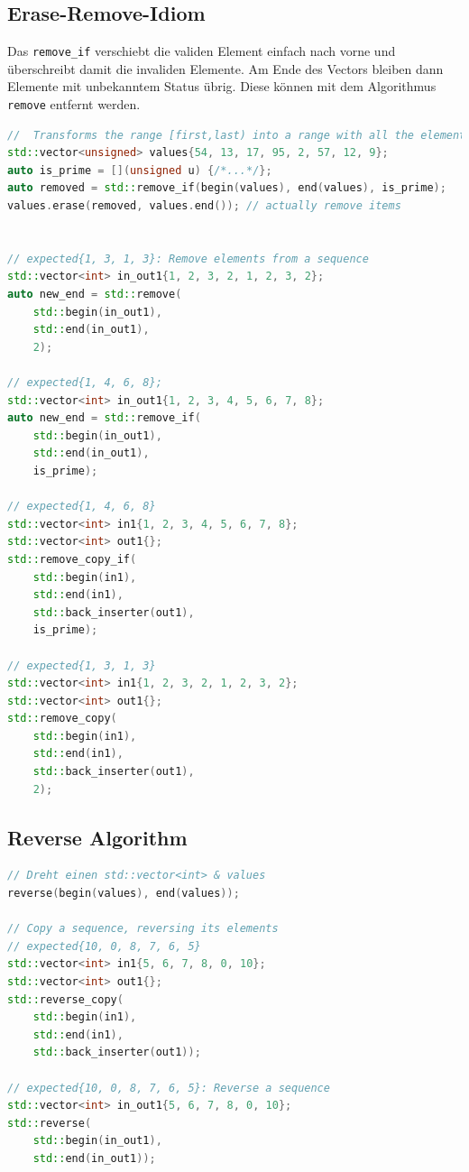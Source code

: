\subsection{Erase-Remove-Idiom}
Das \lstinline|remove_if| verschiebt die validen Element einfach nach vorne und überschreibt damit die invaliden Elemente. Am Ende des Vectors bleiben dann Elemente mit unbekanntem Status übrig. Diese können mit dem Algorithmus \lstinline|remove| entfernt werden.
\begin{lstlisting}[language=C++, caption=Erase-Remove-Idiom]
//  Transforms the range [first,last) into a range with all the elements for which pred returns true removed, and returns an iterator to the new end of that range.
std::vector<unsigned> values{54, 13, 17, 95, 2, 57, 12, 9};
auto is_prime = [](unsigned u) {/*...*/};
auto removed = std::remove_if(begin(values), end(values), is_prime);
values.erase(removed, values.end()); // actually remove items


// expected{1, 3, 1, 3}: Remove elements from a sequence
std::vector<int> in_out1{1, 2, 3, 2, 1, 2, 3, 2};
auto new_end = std::remove(
	std::begin(in_out1),
	std::end(in_out1),
	2);
	
// expected{1, 4, 6, 8};
std::vector<int> in_out1{1, 2, 3, 4, 5, 6, 7, 8};
auto new_end = std::remove_if(
	std::begin(in_out1),
	std::end(in_out1),
	is_prime);
	
// expected{1, 4, 6, 8}
std::vector<int> in1{1, 2, 3, 4, 5, 6, 7, 8};
std::vector<int> out1{};
std::remove_copy_if(
	std::begin(in1),
	std::end(in1),
	std::back_inserter(out1),
	is_prime);
	
// expected{1, 3, 1, 3}
std::vector<int> in1{1, 2, 3, 2, 1, 2, 3, 2};
std::vector<int> out1{};
std::remove_copy(
	std::begin(in1),
	std::end(in1),
	std::back_inserter(out1),
	2);
\end{lstlisting}

\subsection{Reverse Algorithm}
\begin{lstlisting}[language=C++, caption=Reverse Algorithm]
// Dreht einen std::vector<int> & values
reverse(begin(values), end(values));

// Copy a sequence, reversing its elements
// expected{10, 0, 8, 7, 6, 5}
std::vector<int> in1{5, 6, 7, 8, 0, 10};
std::vector<int> out1{};
std::reverse_copy(
	std::begin(in1),
	std::end(in1),
	std::back_inserter(out1));

// expected{10, 0, 8, 7, 6, 5}: Reverse a sequence
std::vector<int> in_out1{5, 6, 7, 8, 0, 10};
std::reverse(
	std::begin(in_out1),
	std::end(in_out1));
\end{lstlisting}


